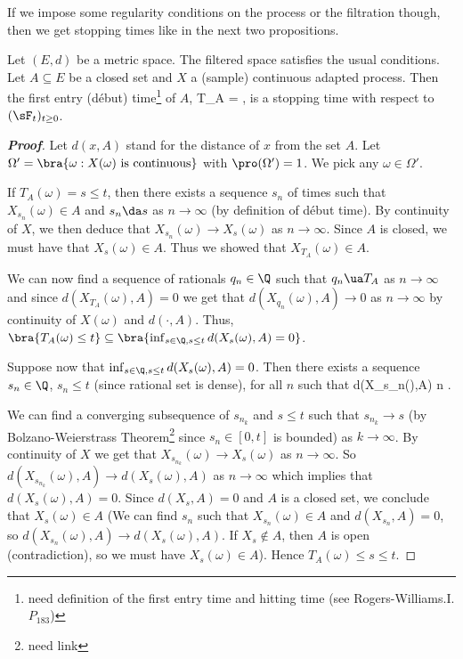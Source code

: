 If we impose some regularity conditions on the process or the filtration though, then we get stopping times like in the next two propositions.

\begin{proposition}\label{pro:debut_time_closed_set_stopping_time}%
Let $(E,d)$ be a metric space. The filtered space satisfies the usual conditions. Let $A\subseteq E$ be a closed set and $X$ a (sample) continuous adapted process. Then the first entry (d\'ebut) time\footnote{need
definition of the first entry time and hitting time (see Rogers-Williams\cite{Rogers_1994}.I.$P_{183}$)} of $A$, \be T_A = \inf{}, \ee is a stopping time with respect to $(\sF_t)_{t\geq 0}$.
\end{proposition}

\begin{proof}[\bf Proof]
Let $d(x,A)$ stand for the distance of $x$ from the set $A$. Let $\Omega' = \bra{\omega:X(\omega)\text{ is continuous}}$ with $\pro(\Omega') = 1$. We pick any $\omega \in \Omega'$.

If $T_A(\omega) = s \leq t$, then there exists a sequence $s_n$ of times such that $X_{s_n}(\omega) \in A$ and $s_n \da s$ as $n \to \infty$ (by definition of d\'ebut time). By continuity of $X$, we then deduce that $X_{s_n}(\omega) \to X_s(\omega)$ as $n\to \infty$. Since $A$ is closed, we must have that $X_s(\omega) \in A$. Thus we showed that $X_{T_A}(\omega) \in A$.

We can now find a sequence of rationals $q_n \in \Q$ such that $q_n \ua T_A$ as $n \to \infty$ and since $d(X_{T_A}(\omega),A) = 0$ we get that $d(X_{q_n}(\omega),A) \to 0$ as $n \to \infty$ by continuity of $X(\omega)$ and $d(\cdot,A)$. Thus, $\bra{T_A(\omega) \leq t} \subseteq \bra{\inf_{s\in \Q,s\leq t} d(X_s(\omega),A) = 0}$.

Suppose now that $\inf_{s\in \Q,s\leq t} d(X_s(\omega),A) = 0$. Then there exists a sequence $s_n \in \Q$, $s_n \leq t$ (since rational set is dense), for all $n$ such that
\be
d(X_{s_n}(\omega),A)  n \to \infty.
\ee

We can find a converging subsequence of $s_{n_k}$ and $s\leq t$ such that $s_{n_k} \to s$ (by Bolzano-Weierstrass Theorem\footnote{need link} since $s_n \in [0,t]$ is bounded) as $k \to \infty$. By continuity of $X$ we get that $X_{s_{n_k}}(\omega) \to X_s(\omega)$ as $n \to\infty$. So $d(X_{s_{n_k}}(\omega),A) \to d(X_s(\omega),A)$ as $n \to\infty$ which implies that $d(X_s(\omega),A) = 0$. Since $d(X_s,A) = 0$ and $A$ is a closed set, we conclude that $X_s(\omega) \in A$ (We can find $s_n$ such that $X_{s_n}(\omega)\in A$ and $d(X_{s_n},A) = 0$, so $d(X_{s_n}(\omega),A) \to d(X_s(\omega),A)$. If $X_s \notin A$, then $A$ is open (contradiction), so we must have $X_s(\omega)\in A$). Hence $T_A(\omega) \leq s \leq t$.


\end{proof}

